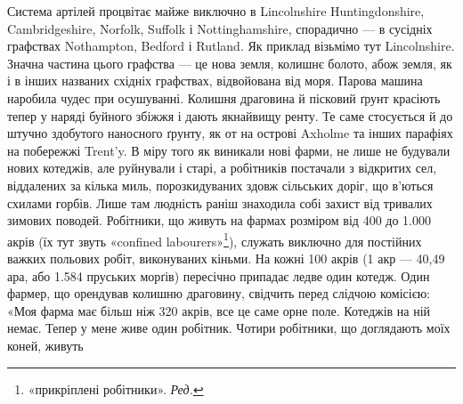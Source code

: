Система артілей процвітає майже виключно в Lincolnshire
Huntingdonshire, Cambridgeshire, Norfolk, Suffolk і Nottinghamshire,
спорадично — в сусідніх графствах Nothampton, Bedford
і Rutland. Як приклад візьмімо тут Lincolnshire. Значна
частина цього графства — це нова земля, колишнє болото, абож
земля, як і в інших названих східніх графствах, відвойована від
моря. Парова машина наробила чудес при осушуванні. Колишня
драговина й пісковий ґрунт красіють тепер у наряді буйного
збіжжя і дають якнайвищу ренту. Те саме стосується й до штучно
здобутого наносного ґрунту, як от на острові Axholme та інших
парафіях на побережжі Trent’y. В міру того як виникали нові
фарми, не лише не будували нових котеджів, але руйнували і
старі, а робітників постачали з відкритих сел, віддалених за
кілька миль, порозкидуваних здовж сільських доріг, що в’ються
схилами горбів. Лише там людність раніш знаходила собі захист
від тривалих зимових поводей. Робітники, що живуть на фармах
розміром від 400 до \num{1.000} акрів (їх тут звуть «confined labourers»\footnote*{
«прикріплені робітники». \emph{Ред.}
}),
служать виключно для постійних важких польових робіт, виконуваних
кіньми. На кожні 100 акрів (1 акр — 40,49 ара, або
\num{1.584} пруських морґів) пересічно припадає ледве один котедж.
Один фармер, що орендував колишню драговину, свідчить перед
слідчою комісією: «Моя фарма має більш ніж 320 акрів, все це
саме орне поле. Котеджів на ній немає. Тепер у мене живе один
робітник. Чотири робітники, що доглядають моїх коней, живуть
\parbreak{}  %
